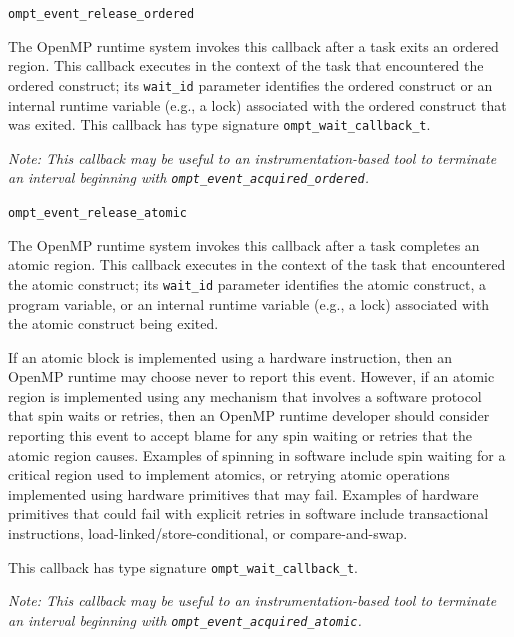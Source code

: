 \documentclass{article}
\newcommand{\descheader}[1]{{\needspace{3\baselineskip}\vspace{1em}\noindent \fbox{#1}}}
\begin{document}
\descheader{Ordered Release}

\begin{description}

\item \verb|ompt_event_release_ordered|

   The OpenMP runtime system invokes this callback
after a task
   exits an ordered region. This callback executes in the
   context of the task that encountered the ordered construct; its \verb|wait_id| parameter identifies the ordered construct or an internal runtime variable (e.g., a lock) associated with the ordered construct that was exited.
   This callback has type signature \verb|ompt_wait_callback_t|. 
   
        {\em Note: This callback may be useful to an instrumentation-based tool to terminate an interval beginning with  
       \verb|ompt_event_acquired_ordered|.}
\end{description}


\descheader{Atomic Release}

\begin{description}
\item \verb|ompt_event_release_atomic|

   The OpenMP runtime system invokes this callback after a task
   completes an atomic region. This callback executes in the
   context of the task that encountered the atomic construct; its \verb|wait_id| parameter identifies the atomic construct, a program variable, or an internal runtime variable (e.g., a lock) associated with the atomic construct being exited.
      
If an atomic block is implemented using a hardware instruction, then an OpenMP runtime may choose never to report this event. 
However, if an atomic region is implemented  using any mechanism that involves a software protocol that spin waits or retries, then an OpenMP runtime developer should consider reporting this event  to accept blame for any spin waiting or retries that the atomic region causes.
Examples of spinning in software include spin waiting for a critical region used to implement atomics,  or retrying atomic operations implemented using hardware primitives that may fail. Examples of hardware primitives that could fail with explicit retries in software include transactional instructions,  load-linked/store-conditional, or compare-and-swap.
   
   This callback has type signature \verb|ompt_wait_callback_t|. 
   
        {\em Note: This callback may be useful to an instrumentation-based tool to terminate an interval beginning with  
       \verb|ompt_event_acquired_atomic|.}
\end{description}
\end{document}
